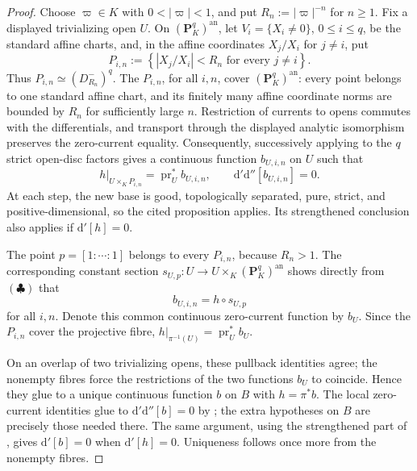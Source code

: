 \begin{proof}
Choose \(\varpi\in K\) with \(0<|\varpi|<1\), and put
\(R_n:=|\varpi|^{-n}\) for \(n\geq1\).  Fix a displayed trivializing
open \(U\).  On \((\mathbf P^q_K)^{\mathrm{an}}\), let
\(V_i=\{X_i\ne0\}\), \(0\leq i\leq q\), be the standard affine charts,
and, in the affine coordinates \(X_j/X_i\) for \(j\ne i\), put
\[
 P_{i,n}:=\left\{\left|X_j/X_i\right|<R_n\text{ for every }j\ne i\right\}.
\]
Thus \(P_{i,n}\simeq(D^-_{R_n})^q\).  The \(P_{i,n}\), for all \(i,n\),
cover \((\mathbf P^q_K)^{\mathrm{an}}\): every point belongs to one
standard affine chart, and its finitely many affine coordinate norms are
bounded by \(R_n\) for sufficiently large \(n\).  Restriction of currents
to opens commutes with the differentials, and transport through the displayed
analytic isomorphism preserves the zero-current equality.  Consequently,
successively applying  to the \(q\)
strict open-disc factors gives a continuous function \(b_{U,i,n}\) on
\(U\) such that
\[
 h|_{U\times_KP_{i,n}}=\operatorname{pr}_U^*b_{U,i,n},
 \qquad
 \mathrm d'\mathrm d''[b_{U,i,n}]=0.
 \tag{\(\clubsuit\)}
\]
At each step, the new base is good, topologically separated, pure, strict,
and positive-dimensional, so the cited proposition applies.  Its strengthened
conclusion also applies if \(\mathrm d'[h]=0\).

The point \(p=[1:\cdots:1]\) belongs to every \(P_{i,n}\), because
\(R_n>1\).  The corresponding constant section
\(s_{U,p}:U\to U\times_K(\mathbf P^q_K)^{\mathrm{an}}\) shows directly
from \((\clubsuit)\) that
\[
                       b_{U,i,n}=h\circ s_{U,p}
\]
for all \(i,n\).  Denote this common continuous zero-current function by
\(b_U\).  Since the \(P_{i,n}\) cover the projective fibre,
\(h|_{\pi^{-1}(U)}=\operatorname{pr}_U^*b_U\).

On an overlap of two trivializing opens, these pullback identities agree;
the nonempty fibres force the restrictions of the two functions \(b_U\) to
coincide.  Hence they glue to a unique continuous function \(b\) on \(B\)
with \(h=\pi^*b\).  The local zero-current identities glue to
\(\mathrm d'\mathrm d''[b]=0\) by ; the
extra hypotheses on \(B\) are precisely those needed there.  The same
argument, using the strengthened part of
, gives \(\mathrm d'[b]=0\) when
\(\mathrm d'[h]=0\).  Uniqueness follows once more from the nonempty
fibres.
\end{proof}
